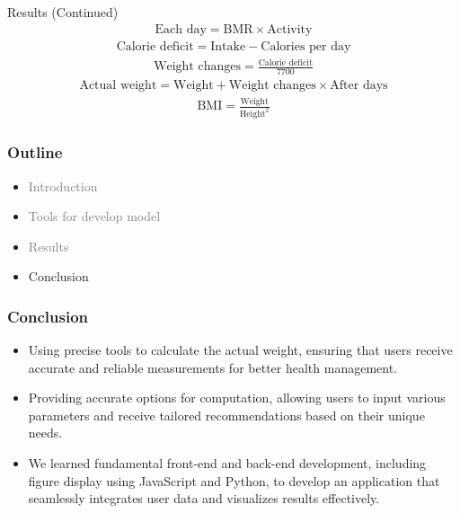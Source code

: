 \documentclass[fleqn]{beamer}
\begin{document}
\begin{frame}{Results (Continued)}
\sloppy
\pause
\begin{align*}
\text{Each day} = \text{BMR} \times \text{Activity}
\end{align*}
\pause
\begin{align*}
\text{Calorie deficit} = \text{Intake} - \text{Calories per day}
\end{align*}
\pause
\begin{align*}
\text{Weight changes} = \frac{\text{Calorie deficit}}{7700} 
\end{align*}
\pause
\begin{align*}
\text{Actual weight}= \text{Weight} + \text{Weight changes} \times \text{After days}
\end{align*}
\pause
\begin{align*}
\text{BMI} = \frac{\text{Weight}}{\text{Height}^2}
\end{align*}
\end{frame}
\begin{frame}
\frametitle{Outline}
\begin{itemize}
        \item \textcolor{gray}{Introduction}
        \vspace{0.15 cm}
        \item \textcolor{gray}{Tools for develop model}
        \vspace{0.15 cm}
        \item \textcolor{gray}{Results}
        \vspace{0.15 cm}
        \item Conclusion
        \vspace{0.15 cm}
\end{itemize}
\end{frame}
\begin{frame}
\frametitle{Conclusion}
    \begin{itemize}
        \pause
        \vspace{0.15 cm}
        \item Using precise tools to calculate the actual weight, ensuring that users receive accurate and reliable measurements for better health management.
        \vspace{0.15 cm}
        \pause
        \item Providing accurate options for computation, allowing users to input various parameters and receive tailored recommendations based on their unique needs.
        \vspace{0.15 cm}
        \pause
        \item We learned fundamental front-end and back-end development, including figure display using JavaScript and Python, to develop an application that seamlessly integrates user data and visualizes results effectively.
    \end{itemize}
\end{frame}
\end{document}
